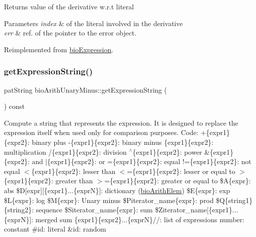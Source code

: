 \begin{DoxyReturn}{Returns}
value of the derivative w.\+r.\+t literal 
\end{DoxyReturn}

\begin{DoxyParams}{Parameters}
{\em index} & of the literal involved in the derivative \\
\hline
{\em err} & ref. of the pointer to the error object. \\
\hline
\end{DoxyParams}


Reimplemented from \hyperlink{classbio_expression_a5915579d1193f25f216c1e273c97f2ce}{bio\+Expression}.

\mbox{\label{classbio_arith_unary_minus_a2e8b40486ef897c00ce5a99e7f8ebd03}} 
\subsubsection{\texorpdfstring{get\+Expression\+String()}{getExpressionString()}}
{\footnotesize\ttfamily pat\+String bio\+Arith\+Unary\+Minus\+::get\+Expression\+String (\begin{DoxyParamCaption}{ }\end{DoxyParamCaption}) const\hspace{0.3cm}{\ttfamily [virtual]}}

Compute a string that represents the expression. It is designed to replace the expression itself when used only for comparison purposes. Code\+: +\{expr1\}\{expr2\}\+: binary plus -\/\{expr1\}\{expr2\}\+: binary minus \{expr1\}\{expr2\}\+: multiplication /\{expr1\}\{expr2\}\+: division $^\wedge$\{expr1\}\{expr2\}\+: power \&\{expr1\}\{expr2\}\+: and $\vert$\{expr1\}\{expr2\}\+: or =\{expr1\}\{expr2\}\+: equal !=\{expr1\}\{expr2\}\+: not equal $<$\{expr1\}\{expr2\}\+: lesser than $<$=\{expr1\}\{expr2\}\+: lesser or equal to $>$\{expr1\}\{expr2\}\+: greater than $>$=\{expr1\}\{expr2\}\+: greater or equal to \$A\{expr\}\+: abs \$D\mbox{[}expr\mbox{]}\mbox{[}\{expr1\}...\{exprN\}\mbox{]}\+: dictionary (\hyperlink{classbio_arith_elem}{bio\+Arith\+Elem}) \$E\{expr\}\+: exp \$L\{expr\}\+: log \$M\{expr\}\+: Unary minus \$\+Piterator\+\_\+name\{expr\}\+: prod \$Q\{string1\}\{string2\}\+: sequence \$\+Siterator\+\_\+name\{expr\}\+: sum \$\+Ziterator\+\_\+name\mbox{[}\{expr1\}...\{exprN\}\mbox{]}\+: merged sum \{expr1\}\{expr2\}...\{exprN\}//\+: list of expressions number\+: constant \#id\+: literal \&id\+: random 

